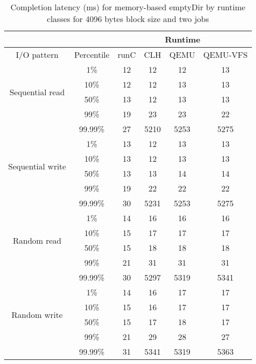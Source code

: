\begin{table}
\centering
\label{table:ResultsEDMEMClatByRTC4096-2}
\caption{Completion latency (ms) for memory-based emptyDir by runtime classes for 4096 bytes block size and two jobs}
\begin{tabular}{ |c|c|c|c|c|c| }
 \hline
 \multicolumn{2}{|c}{} & \multicolumn{4}{|c|}{Runtime} \\
 \hline
 I/O pattern & Percentile & runC & CLH & QEMU & QEMU-VFS \\
 \hline
 \multirow{4}{4em}{Sequential read} & 1\% & 12 & 12 & 12 & 13 \\
 & 10\% & 12 & 12 & 13 & 13 \\
 & 50\% & 13 & 12 & 13 & 13 \\
 & 99\% & 19 & 23 & 23 & 22 \\
 & 99.99\% & 27 & 5210 & 5253 & 5275 \\

 \hline
 \multirow{4}{4em}{Sequential write} & 1\% & 13 & 12 & 13 & 13 \\
 & 10\% & 13 & 12 & 13 & 13 \\
 & 50\% & 13 & 13 & 14 & 14 \\
 & 99\% & 19 & 22 & 22 & 22 \\
 & 99.99\% & 30 & 5231 & 5253 & 5275 \\
 \hline
 \multirow{4}{4em}{Random read} & 1\% & 14 & 16 & 16 & 16 \\
 & 10\% & 15 & 17 & 17 & 17 \\
 & 50\% & 15 & 18 & 18 & 18 \\
 & 99\% & 21 & 31 & 31 & 31 \\
 & 99.99\% & 30 & 5297 & 5319 & 5341 \\
 \hline
 \multirow{4}{4em}{Random write} & 1\% & 14 & 16 & 17 & 17 \\
 & 10\% & 15 & 16 & 17 & 17 \\
 & 50\% & 15 & 17 & 18 & 17 \\
 & 99\% & 21 & 29 & 28 & 27 \\
 & 99.99\% & 31 & 5341 & 5319 & 5363 \\
 \hline
\end{tabular}
\end{table}